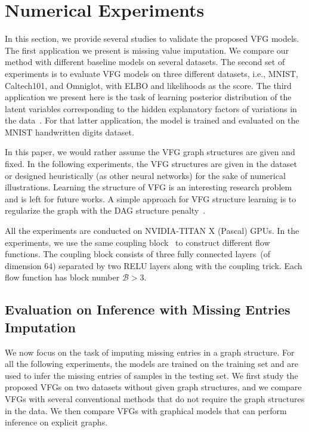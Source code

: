 \documentclass[sigconf, anonymous, review]{acmart}
\theoremstyle{plain}
\theoremstyle{definition}
\theoremstyle{remark}
\begin{document}
\section{Numerical Experiments}\label{sec:numerical}
In this section, we provide several studies to validate the proposed VFG models. 
The first  application we present is missing value imputation. We compare our method with different baseline models  on several  datasets.
The second set of experiments is to evaluate VFG models on three different datasets, i.e.,  MNIST, Caltech101, and Omniglot, with ELBO and likelihoods as the score.  
The third application we present here is the task of learning posterior distribution of the latent variables corresponding to the hidden explanatory factors of variations in the data~\cite{bengio2013representation}.
For that latter application, the model is trained and evaluated on the MNIST handwritten digits dataset.
 
 
In this paper,  we would rather assume the VFG graph structures are given and fixed.  In the following experiments, the VFG structures are given in the dataset or  designed heuristically (as other neural networks) for the sake of numerical illustrations.  Learning the structure of VFG is an interesting research problem and is left for future works. A simple approach for VFG structure learning is to regularize the graph with the DAG structure penalty~\cite{Zheng2018,wehenkel2021graphical}.


All the experiments are conducted on NVIDIA-TITAN X (Pascal) GPUs. 
In  the experiments, we use the same  coupling block~\cite{Dinh2016DensityEU} to construct different flow functions. The coupling block consists of three fully connected layers~(of dimension $64$) separated by two RELU layers along with the coupling trick. 
Each flow function has block number $\mathcal{B} > 3$. 


\subsection{Evaluation on Inference with Missing Entries Imputation}%
We now focus on the task of imputing missing entries in a graph structure. For all the following experiments, the models are trained on the training set and are used to infer the missing entries of samples in the testing set. 
We first study the proposed VFGs on two datasets without given graph structures, and we compare VFGs with several conventional methods that do not require the  graph  structures in the data.  We then compare VFGs with graphical models that can perform inference on explicit graphs. 
\end{document}
